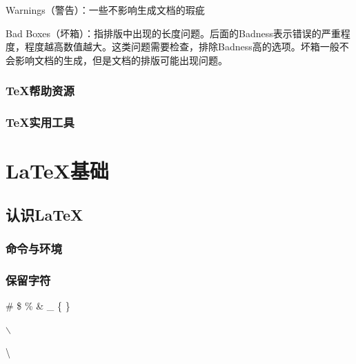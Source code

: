 \documentclass{ctexart}
\begin{document}
            Warnings（警告）：一些不影响生成文档的瑕疵

            Bad Boxes（坏箱）：指排版中出现的长度问题。后面的Badness表示错误的严重程度，程度越高数值越大。这类问题需要检查，排除Badness高的选项。坏箱一般不会影响文档的生成，但是文档的排版可能出现问题。

        \subsubsection{\TeX 帮助资源}
        \subsubsection{\TeX 实用工具}

\section{\LaTeX 基础}
    \subsection{认识\LaTeX}
        \subsubsection{命令与环境}
        \subsubsection{保留字符}
            \# 
            \$ 
            \% %
            \& 
            \_ 
            \{ 
            \} 

            $\backslash$

            \textbackslash

            \textrm{}
\end{document}
